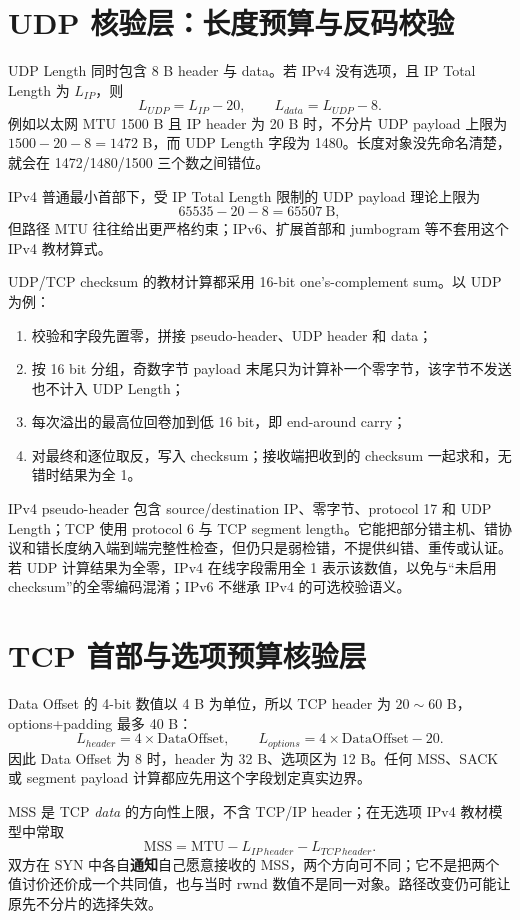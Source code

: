 \documentclass[UTF8,fontset=none,11pt,a4paper]{ctexart}
\begin{document}
\section{UDP 核验层：长度预算与反码校验}

UDP Length 同时包含 8 B header 与 data。若 IPv4 没有选项，且 IP Total Length 为 $L_{IP}$，则
\[
L_{UDP}=L_{IP}-20,\qquad L_{data}=L_{UDP}-8.
\]
例如以太网 MTU 1500 B 且 IP header 为 20 B 时，不分片 UDP payload 上限为 $1500-20-8=1472$ B，而 UDP Length 字段为 1480。长度对象没先命名清楚，就会在 1472/1480/1500 三个数之间错位。

IPv4 普通最小首部下，受 IP Total Length 限制的 UDP payload 理论上限为
\[
65535-20-8=65507\ \text{B},
\]
但路径 MTU 往往给出更严格约束；IPv6、扩展首部和 jumbogram 等不套用这个 IPv4 教材算式。

UDP/TCP checksum 的教材计算都采用 16-bit one's-complement sum。以 UDP 为例：
\begin{enumerate}
\item 校验和字段先置零，拼接 pseudo-header、UDP header 和 data；
\item 按 16 bit 分组，奇数字节 payload 末尾只为计算补一个零字节，该字节不发送也不计入 UDP Length；
\item 每次溢出的最高位回卷加到低 16 bit，即 end-around carry；
\item 对最终和逐位取反，写入 checksum；接收端把收到的 checksum 一起求和，无错时结果为全 1。
\end{enumerate}

IPv4 pseudo-header 包含 source/destination IP、零字节、protocol 17 和 UDP Length；TCP 使用 protocol 6 与 TCP segment length。它能把部分错主机、错协议和错长度纳入端到端完整性检查，但仍只是弱检错，不提供纠错、重传或认证。若 UDP 计算结果为全零，IPv4 在线字段需用全 1 表示该数值，以免与“未启用 checksum”的全零编码混淆；IPv6 不继承 IPv4 的可选校验语义。

\section{TCP 首部与选项预算核验层}

Data Offset 的 4-bit 数值以 4 B 为单位，所以 TCP header 为 $20\sim60$ B，options+padding 最多 40 B：
\[
L_{header}=4\times\mathrm{DataOffset},\qquad
L_{options}=4\times\mathrm{DataOffset}-20.
\]
因此 Data Offset 为 8 时，header 为 32 B、选项区为 12 B。任何 MSS、SACK 或 segment payload 计算都应先用这个字段划定真实边界。

MSS 是 TCP \emph{data} 的方向性上限，不含 TCP/IP header；在无选项 IPv4 教材模型中常取
\[
\mathrm{MSS}=\mathrm{MTU}-L_{IP\ header}-L_{TCP\ header}.
\]
双方在 SYN 中各自\textbf{通知}自己愿意接收的 MSS，两个方向可不同；它不是把两个值讨价还价成一个共同值，也与当时 rwnd 数值不是同一对象。路径改变仍可能让原先不分片的选择失效。
\end{document}

